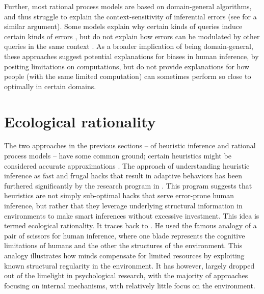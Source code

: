 Further, most rational process models are based on domain-general algorithms, and thus struggle to explain the context-sensitivity of inferential errors (see \citet{mercier2017enigma} for a similar argument). Some models explain why certain kinds of queries induce certain kinds of errors \citep{dasgupta2017hypotheses}, but do not explain how errors can be modulated by other queries in the same context \citep{gershman2014amortized,dasgupta2018remembrance}. As a broader implication of being domain-general, these approaches suggest potential explanations for biases in human inference, by positing limitations on computations, but do not provide explanations for how people (with the same limited computation) can sometimes perform so close to optimally in certain domains.

\section{Ecological rationality}

The two approaches in the previous sections -- of heuristic inference and rational process models -- have some common ground; certain heuristics might be considered accurate approximations \citep{gigerenzer2009homo, parpart2018heuristics, belousov2016catching}. The approach of understanding heuristic inference as fast and frugal hacks that result in adaptive behaviors has been furthered significantly by the research program in \citet{gigerenzer2011heuristic}. This program suggests that heuristics are not simply sub-optimal hacks that serve error-prone human inference, but rather that they leverage underlying structural information in environments to make smart inferences without excessive investment. This idea is termed ecological rationality. It traces back to \citet{simon1955behavioral}. He used the famous analogy of a pair of scissors for human inference, where one blade represents the cognitive limitations of humans and the other the structures of the environment. This analogy illustrates how minds compensate for limited resources by exploiting known structural regularity in the environment. It has however, largely dropped out of the limelight in psychological research, with the majority of approaches focusing on internal mechanisms, with relatively little focus on the environment.

